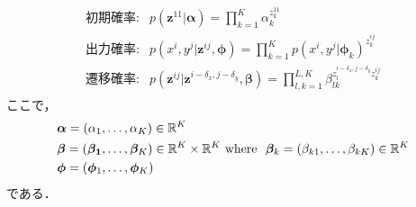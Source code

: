 \begin{align}
\begin{array}{ll}
\mbox{初期確率:}  & p(\bm{z}^{11}|\bm{\alpha})=\prod_{k=1}^K \alpha_k^{z_k^{11}}\\
\mbox{出力確率:}  & p(x^i, y^j|\bm{z}^{ij}, \bm{\phi}) = \prod_{k=1}^K p(x^i, y^j|\bm{\phi}_k)^{z^{ij}_k}\\
\mbox{遷移確率:}  & p(\bm{z}^{ij}|\bm{z}^{i-\delta_x, j-\delta_y}, \bm{\beta}) =  \prod_{l,k=1}^{L,K} \beta_{lk}^{z^{i-\delta_x,j-\delta_y}_l z^{ij}_k}
\end{array}
\end{align}
ここで，
\begin{align}
&\bm{\alpha} = (\alpha_1, \ldots, \alpha_K)\in\mathbb{R}^K\label{eq:res_a}\\
&\bm{\beta} =  (\bm{\beta_1}, \ldots ,\bm{\beta}_K)\in\mathbb{R}^K\times\mathbb{R}^K \mbox{ where } \ \bm{\beta}_k=(\beta_{k1},\ldots, \beta_{kK})\in\mathbb{R}^K\label{eq:res_b}\\
&\bm{\phi}  = (\bm{\phi}_1,\ldots,\bm{\phi}_K)
\end{align}
である．


